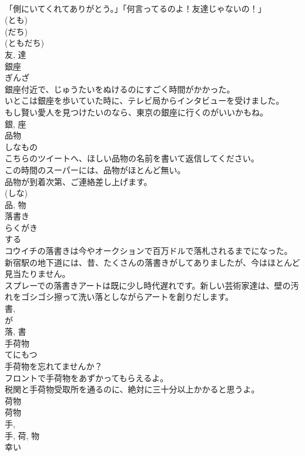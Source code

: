 \documentclass[8pt]{extreport}
\begin{document}
\begin{CJK}{UTF8}{min}
\\	「側にいてくれてありがとう。」「何言ってるのよ！友達じゃないの！」	
\\	(とも) 
\\	(だち) 
\\	(ともだち) 
\\	友, 達	
\\	銀座	
\\	ぎんざ	
\\	銀座付近で、じゅうたいをぬけるのにすごく時間がかかった。	
\\	いとこは銀座を歩いていた時に、テレビ局からインタビューを受けました。	
\\	もし賢い愛人を見つけたいのなら、東京の銀座に行くのがいいかもね。	
\\	銀, 座	
\\	品物	
\\	しなもの	
\\	こちらのツイートへ、ほしい品物の名前を書いて返信してください。	
\\	この時間のスーパーには、品物がほとんど無い。	
\\	品物が到着次第、ご連絡差し上げます。	
\\	(しな) 
\\	品, 物	
\\	落書き	
\\	らくがき	
\\	する 
\\	コウイチの落書きは今やオークションで百万ドルで落札されるまでになった。	
\\	新宿駅の地下道には、昔、たくさんの落書きがしてありましたが、今はほとんど見当たりません。	
\\	スプレーでの落書きアートは既に少し時代遅れです。新しい芸術家達は、壁の汚れをゴシゴシ擦って洗い落としながらアートを創りだします。	
\\	書, 
\\	が 
\\	落, 書	
\\	手荷物	
\\	てにもつ	
\\	手荷物を忘れてませんか？	
\\	フロントで手荷物をあずかってもらえるよ。	
\\	税関と手荷物受取所を通るのに、絶対に三十分以上かかると思うよ。	
\\	荷物 
\\	荷物 
\\	手, 
\\	手, 荷, 物	
\\	幸い	

\end{CJK}
\end{document}
